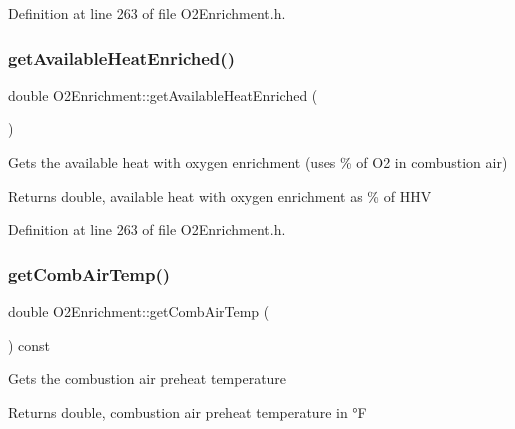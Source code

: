 Definition at line 263 of file O2\+Enrichment.\+h.

\mbox{\label{class_o2_enrichment_afc7f9ea349f338ead76255218769a3e3}} 
\subsubsection{\texorpdfstring{get\+Available\+Heat\+Enriched()}{getAvailableHeatEnriched()}\hspace{0.1cm}{\footnotesize\ttfamily [3/3]}}
{\footnotesize\ttfamily double O2\+Enrichment\+::get\+Available\+Heat\+Enriched (\begin{DoxyParamCaption}{ }\end{DoxyParamCaption})\hspace{0.3cm}{\ttfamily [inline]}}

Gets the available heat with oxygen enrichment (uses \% of O2 in combustion air) \begin{DoxyReturn}{Returns}
double, available heat with oxygen enrichment as \% of H\+HV 
\end{DoxyReturn}


Definition at line 263 of file O2\+Enrichment.\+h.

\mbox{\label{class_o2_enrichment_ad3e6bab8c49a1ae5232330fc0e1a537a}} 
\subsubsection{\texorpdfstring{get\+Comb\+Air\+Temp()}{getCombAirTemp()}\hspace{0.1cm}{\footnotesize\ttfamily [1/3]}}
{\footnotesize\ttfamily double O2\+Enrichment\+::get\+Comb\+Air\+Temp (\begin{DoxyParamCaption}{ }\end{DoxyParamCaption}) const\hspace{0.3cm}{\ttfamily [inline]}}

Gets the combustion air preheat temperature \begin{DoxyReturn}{Returns}
double, combustion air preheat temperature in °F 
\end{DoxyReturn}


